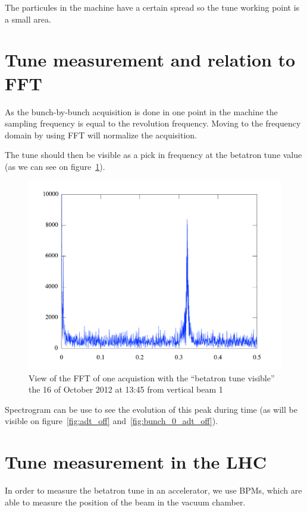 The particules in the machine have a certain spread so the tune working point is a small area.

\section{Tune measurement and relation to FFT}

As the bunch-by-bunch acquisition is done in one point in the machine the sampling frequency is equal to the revolution frequency. Moving to the frequency domain by using \gls{FFT} will normalize the acquisition.

The tune should then be visible as a pick in frequency at the betatron tune value (as we can see on figure~\ref{fig:tune_single}).

\begin{figure}[H]
\centering
\label{fig:tune_single}
\caption{View of the FFT of one acquistion with the ``betatron tune visible'' the 16 of October 2012 at 13:45 from vertical beam 1}
\includegraphics[scale=0.5]{fft_single.pdf}
\end{figure}

Spectrogram can be use to see the evolution of this peak during time (as will be visible on figure~\ref{fig:adt_off} and~\ref{fig:bunch_0_adt_off}).

\section{Tune measurement in the LHC}

In order to measure the betatron tune in an accelerator, we use
\glspl{BPM}, which are able to measure the position of the beam in the
vacuum chamber.


